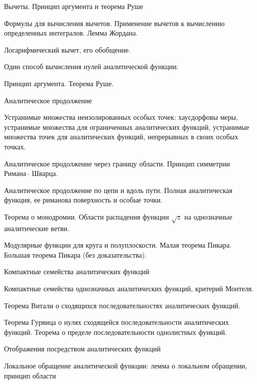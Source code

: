 \documentclass[a4paper]{article}
\begin{document}
\begin{nums}{-2}
\item Вычеты. Принцип аргумента и теорема Руше
\begin{items}{-2}
\item Формулы для вычисления вычетов. Применение вычетов к вычислению определенных интегралов. Лемма Жордана.
\item Логарифмический вычет, его обобщение.
\item Один способ вычисления нулей аналитической функции.
\item Принцип аргумента. Теорема Руше.
\end{items}
\item Аналитическое продолжение
\begin{items}{-2}
\item Устранимые множества неизолированных особых точек: хаусдорфовы меры, устранимые множества для
      ограниченных аналитических функций, устранимые множества точек для аналитических функций,
      непрерывных в своих особых точках.
\item Аналитическое продолжение через границу области. Принцип симметрии Римана-- Шварца.
\item Аналитическое продолжение по цепи и вдоль пути. Полная аналитическая функция, ее риманова
      поверхность и особые точки.
\item Теорема о монодромии. Области распадения функции $\sqrt z$ на однозначные аналитические ветви.
\item Модулярные функции для круга и полуплоскости. Малая теорема Пикара. Большая теорема Пикара (без доказательства).
\end{items}
\item Компактные семейства аналитических функций
\begin{items}{-2}
\item Компактные семейства однозначных аналитических функций, критерий Монтеля.
\item Теорема Витали о сходящихся последовательностях аналитических функций.
\item Теорема Гурвица о нулях сходящейся последовательности аналитических функций. Теорема о пределе
      последовательности однолистных функций.
\end{items}
\item Отображения посредством аналитических функций
\begin{items}{-2}
\item Локальное обращение аналитической функции: лемма о локальном обращении, принцип области

\end{items}
\end{nums}
\end{document}

